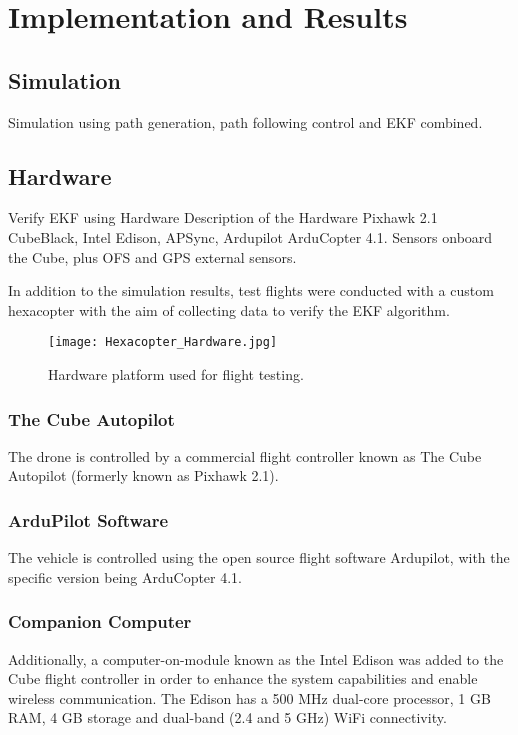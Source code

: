 
\chapter{Implementation and Results}

\section{Simulation}\label{section:Implementation}
Simulation using path generation, path following control and EKF combined.
\section{Hardware}\label{section:Hardware}
Verify EKF using Hardware
Description of the Hardware
Pixhawk 2.1 CubeBlack, Intel Edison, APSync, Ardupilot ArduCopter 4.1. 
Sensors onboard the Cube, plus OFS and GPS external sensors.

In addition to the simulation results, test flights were conducted with a custom hexacopter with the aim of collecting data to verify the EKF algorithm.

\begin{figure}[htb]
	\texttt{[image: Hexacopter\_Hardware.jpg]}%
	\caption{Hardware platform used for flight testing.}%
	\label{fig:hardware}%
\end{figure}

\subsection{The Cube Autopilot}
The drone is controlled by a commercial flight controller known as The Cube Autopilot (formerly known as Pixhawk 2.1).
\subsection{ArduPilot Software}
The vehicle is controlled using the open source flight software Ardupilot, with the specific version being ArduCopter 4.1.
\subsection{Companion Computer}
Additionally, a computer-on-module known as the Intel Edison was added to the Cube flight controller in order to enhance the system capabilities and enable wireless communication. The Edison has a 500 MHz dual-core processor, 1 GB RAM, 4 GB storage and dual-band (2.4 and 5 GHz) WiFi connectivity.

